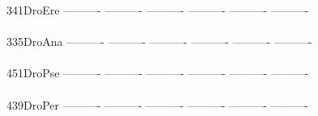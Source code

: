 \documentclass[11pt,twoside,reqno,a4paper]{article}
\begin{document}
{341\hspace*{1\charwidth}DroEre	----------	----------	----------	----------	----------	----------	\\
\hspace*{4\charwidth}\hspace*{7\charwidth}\hspace*{1\charwidth}\hspace*{1\charwidth}\hspace*{1\charwidth}\hspace*{1\charwidth}\hspace*{1\charwidth}\hspace*{1\charwidth}\\
335\hspace*{1\charwidth}DroAna	----------	----------	----------	----------	----------	----------	\\
\hspace*{4\charwidth}\hspace*{7\charwidth}\hspace*{1\charwidth}\hspace*{1\charwidth}\hspace*{1\charwidth}\hspace*{1\charwidth}\hspace*{1\charwidth}\hspace*{1\charwidth}\\
451\hspace*{1\charwidth}DroPse	----------	----------	----------	----------	----------	----------	\\
\hspace*{4\charwidth}\hspace*{7\charwidth}\hspace*{1\charwidth}\hspace*{1\charwidth}\hspace*{1\charwidth}\hspace*{1\charwidth}\hspace*{1\charwidth}\hspace*{1\charwidth}\\
439\hspace*{1\charwidth}DroPer	----------	----------	----------	----------	----------	----------	\\
\hspace*{4\charwidth}\hspace*{7\charwidth}\hspace*{1\charwidth}\hspace*{1\charwidth}\hspace*{1\charwidth}\hspace*{1\charwidth}\hspace*{1\charwidth}\hspace*{1\charwidth}\\
}
\end{document}
